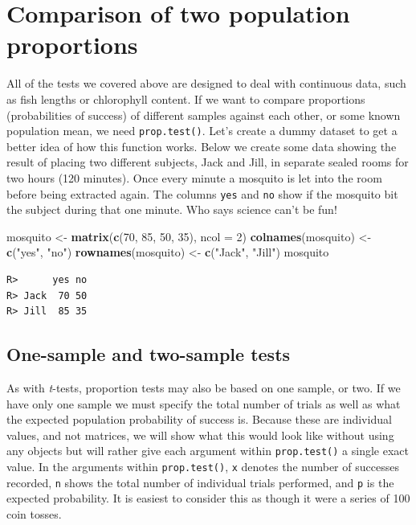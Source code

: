 \documentclass[english,10pt,a4paper,oneside]{book}
\newenvironment{Shaded}{\begin{snugshade}}{\end{snugshade}}
\newcommand{\KeywordTok}[1]{\textcolor[rgb]{0.13,0.29,0.53}{\textbf{#1}}}
\newcommand{\DataTypeTok}[1]{\textcolor[rgb]{0.13,0.29,0.53}{#1}}
\newcommand{\DecValTok}[1]{\textcolor[rgb]{0.00,0.00,0.81}{#1}}
\newcommand{\StringTok}[1]{\textcolor[rgb]{0.31,0.60,0.02}{#1}}
\newcommand{\NormalTok}[1]{#1}
\theoremstyle{definition}
\theoremstyle{definition}
\theoremstyle{definition}
\theoremstyle{remark}
\begin{document}
\section{Comparison of two population
proportions}\label{comparison-of-two-population-proportions}

All of the tests we covered above are designed to deal with continuous
data, such as fish lengths or chlorophyll content. If we want to compare
proportions (probabilities of success) of different samples against each
other, or some known population mean, we need \texttt{prop.test()}.
Let's create a dummy dataset to get a better idea of how this function
works. Below we create some data showing the result of placing two
different subjects, Jack and Jill, in separate sealed rooms for two
hours (120 minutes). Once every minute a mosquito is let into the room
before being extracted again. The columns \texttt{yes} and \texttt{no}
show if the mosquito bit the subject during that one minute. Who says
science can't be fun!

\begin{Shaded}
\begin{Highlighting}[]
\NormalTok{mosquito <-}\StringTok{ }\KeywordTok{matrix}\NormalTok{(}\KeywordTok{c}\NormalTok{(}\DecValTok{70}\NormalTok{, }\DecValTok{85}\NormalTok{, }\DecValTok{50}\NormalTok{, }\DecValTok{35}\NormalTok{), }\DataTypeTok{ncol =} \DecValTok{2}\NormalTok{)}
\KeywordTok{colnames}\NormalTok{(mosquito) <-}\StringTok{ }\KeywordTok{c}\NormalTok{(}\StringTok{"yes"}\NormalTok{, }\StringTok{"no"}\NormalTok{)}
\KeywordTok{rownames}\NormalTok{(mosquito) <-}\StringTok{ }\KeywordTok{c}\NormalTok{(}\StringTok{"Jack"}\NormalTok{, }\StringTok{"Jill"}\NormalTok{)}
\NormalTok{mosquito}
\end{Highlighting}
\end{Shaded}

\begin{verbatim}
R>      yes no
R> Jack  70 50
R> Jill  85 35
\end{verbatim}

\subsection{One-sample and two-sample
tests}\label{one-sample-and-two-sample-tests}

As with \emph{t}-tests, proportion tests may also be based on one
sample, or two. If we have only one sample we must specify the total
number of trials as well as what the expected population probability of
success is. Because these are individual values, and not matrices, we
will show what this would look like without using any objects but will
rather give each argument within \texttt{prop.test()} a single exact
value. In the arguments within \texttt{prop.test()}, \texttt{x} denotes
the number of successes recorded, \texttt{n} shows the total number of
individual trials performed, and \texttt{p} is the expected probability.
It is easiest to consider this as though it were a series of 100 coin
tosses.
\end{document}
